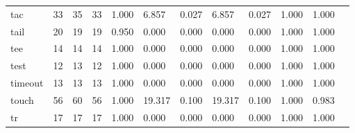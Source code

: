 \begin{longtable}{lp{1.00cm}p{1.00cm}p{1.00cm}p{1.00cm}p{1.00cm}p{1.00cm}p{1.00cm}p{1.00cm}p{1.00cm}p{1.00cm}p{1.00cm}}
tac       &                           33 &                 35 &                                33 &                                      1.000 &                                  6.857 &                                        0.027 &                             6.857 &                                   0.027 &                        1.000 &                                        1.000 \\
tail      &                           20 &                 19 &                                19 &                                      0.950 &                                  0.000 &                                        0.000 &                             0.000 &                                   0.000 &                        1.000 &                                        1.000 \\
tee       &                           14 &                 14 &                                14 &                                      1.000 &                                  0.000 &                                        0.000 &                             0.000 &                                   0.000 &                        1.000 &                                        1.000 \\
test      &                           12 &                 13 &                                12 &                                      1.000 &                                  0.000 &                                        0.000 &                             0.000 &                                   0.000 &                        1.000 &                                        1.000 \\
timeout   &                           13 &                 13 &                                13 &                                      1.000 &                                  0.000 &                                        0.000 &                             0.000 &                                   0.000 &                        1.000 &                                        1.000 \\
touch     &                           56 &                 60 &                                56 &                                      1.000 &                                 19.317 &                                        0.100 &                            19.317 &                                   0.100 &                        1.000 &                                        0.983 \\
tr        &                           17 &                 17 &                                17 &                                      1.000 &                                  0.000 &                                        0.000 &                             0.000 &                                   0.000 &                        1.000 &                                        1.000 \\

\end{longtable}
